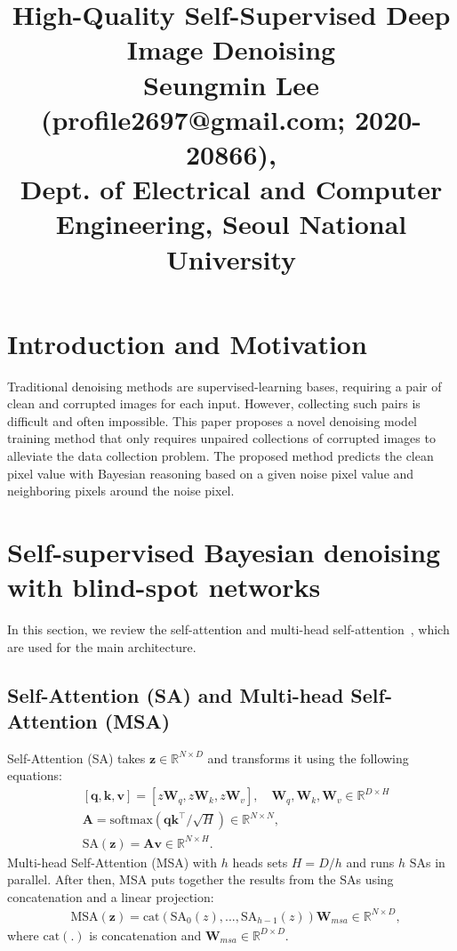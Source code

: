 \documentclass[10pt,twocolumn,letterpaper]{article}
\begin{document}
\title{High-Quality Self-Supervised Deep Image Denoising\\ {\rm {\normalsize Seungmin Lee (profile2697@gmail.com; 2020-20866), \\Dept. of Electrical and Computer Engineering, Seoul National University}}}   %

\maketitle
\thispagestyle{empty}

\section{Introduction and Motivation}
Traditional denoising methods are supervised-learning bases, requiring a pair of clean and corrupted images for each input. However, collecting such pairs is difficult and often impossible. This paper proposes a novel denoising model training method that only requires unpaired collections of corrupted images to alleviate the data collection problem. 
The proposed method predicts the clean pixel value with Bayesian reasoning based on a given noise pixel value and neighboring pixels around the noise pixel.


\section{Self-supervised Bayesian denoising with blind-spot networks}
In this section, we review the self-attention and multi-head self-attention~\cite{SA}, which are used for the main architecture.
\subsection{Self-Attention (SA) and Multi-head Self-Attention (MSA)} 
Self-Attention (SA) takes $\mathbf{z} \in \mathbb{R}^{N \times D}$ and transforms it using the following equations:
\begin{align*}
	&[\mathbf{q}, \mathbf{k}, \mathbf{v}] = [z\mathbf{W}_q, z\mathbf{W}_k, z\mathbf{W}_v], \quad \mathbf{W}_q, \mathbf{W}_k, \mathbf{W}_v \in \mathbb{R}^{D \times H}	\\
	&\mathbf{A} = \text{softmax}(\mathbf{q}\mathbf{k}^\intercal / \sqrt{H}) \in \mathbb{R}^{N \times N}, \\
	&\text{SA}(\mathbf{z}) = \mathbf{A}\mathbf{v} \in \mathbb{R}^{N \times H}.
\end{align*}
Multi-head Self-Attention (MSA) with $h$ heads sets $H = D / h$ and runs $h$ $\text{SA}$s in parallel. After then, MSA puts together the results from the $\text{SA}$s using concatenation and a linear projection:
\begin{align*}
	&\text{MSA}(\mathbf{z}) = \text{cat}(\text{SA}_0(z), ..., \text{SA}_{h-1}(z))\mathbf{W}_{msa} \in \mathbb{R}^{N \times D},
\end{align*}
where $\text{cat}(.)$ is concatenation and $\mathbf{W}_{msa} \in \mathbb{R}^{D \times D}$.
\end{document}
